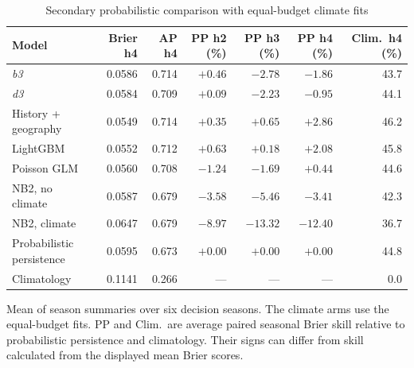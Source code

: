 \documentclass[10pt]{article}
\newcommand{\bthree}{\textit{b3}}
\newcommand{\dthree}{\textit{d3}}
\begin{document}
\begin{table}[!h]
\caption{Secondary probabilistic comparison with equal-budget climate fits}
\label{tab:prob}
\centering
\begin{tabular}{@{}lrrrrrr@{}}
\toprule
Model & Brier h4 & AP h4 & PP h2 (\%) & PP h3 (\%) & PP h4 (\%) & Clim.\ h4 (\%)\\
\midrule
\bthree{} & 0.0586 & 0.714 & $+0.46$ & $-2.78$ & $-1.86$ & 43.7\\
\dthree{} & 0.0584 & 0.709 & $+0.09$ & $-2.23$ & $-0.95$ & 44.1\\
History + geography & 0.0549 & 0.714 & $+0.35$ & $+0.65$ & $+2.86$ & 46.2\\
LightGBM & 0.0552 & 0.712 & $+0.63$ & $+0.18$ & $+2.08$ & 45.8\\
Poisson GLM & 0.0560 & 0.708 & $-1.24$ & $-1.69$ & $+0.44$ & 44.6\\
NB2, no climate & 0.0587 & 0.679 & $-3.58$ & $-5.46$ & $-3.41$ & 42.3\\
NB2, climate & 0.0647 & 0.679 & $-8.97$ & $-13.32$ & $-12.40$ & 36.7\\
Probabilistic persistence & 0.0595 & 0.673 & $+0.00$ & $+0.00$ & $+0.00$ & 44.8\\
Climatology & 0.1141 & 0.266 & --- & --- & --- & 0.0\\
\bottomrule
\end{tabular}

\vspace{2pt}\parbox{0.9\textwidth}{\footnotesize Mean of season summaries over six decision seasons. The climate arms use the equal-budget fits. PP and Clim.\ are average paired seasonal Brier skill relative to probabilistic persistence and climatology. Their signs can differ from skill calculated from the displayed mean Brier scores.}
\end{table}
\end{document}
